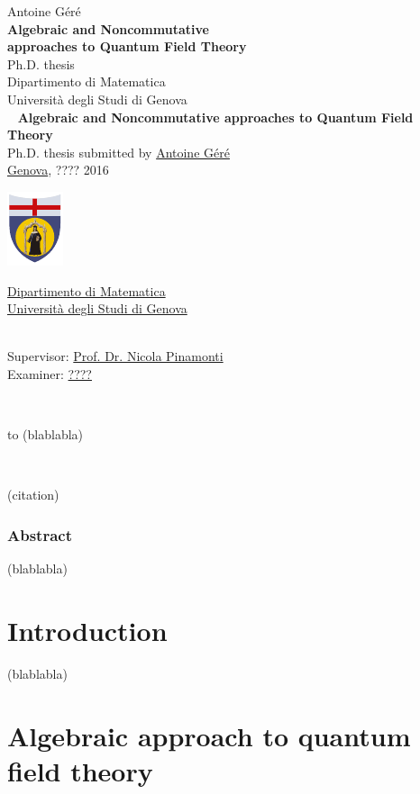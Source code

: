 \documentclass[10pt]{book}
\makeatletter
\newcommand*{\makepagetitle}{%
%
{\raggedright%
%
%
%
%
\thispagestyle{empty}%
%
\vspace*{50pt}
%
{\LARGE Antoine Géré}\\%
%
\vspace*{120pt}%
%
{\Huge\bfseries Algebraic and Noncommutative \\[8pt] approaches to Quantum Field Theory}\\[\baselineskip]%
%
\vspace*{60pt}%
%
{\LARGE Ph.D. thesis}\\[\baselineskip]%
%
\vspace*{60pt}%
%
{\LARGE Dipartimento di Matematica}\\[\baselineskip]%
%
\vspace*{1pt}
%
{\LARGE Università degli Studi di Genova}\\[\baselineskip]%
%
\vfill%
%
%
%
%
\newpage%
%
\thispagestyle{empty}%
%
\ \vfill%
%
%
\textbf{Algebraic and Noncommutative approaches to Quantum Field Theory} \\[2pt]
Ph.D. thesis submitted by \href{mailto:gere@dima.unige.it}{Antoine Géré} \\[1pt]
\href{http://www.comune.genova.it/}{Genova}, ???? 2016 \\[10pt]
%
%
\begin{minipage}{0.1\linewidth}
\includegraphics[scale=1]{unige.pdf}
\end{minipage}
%
\begin{minipage}{0.85\linewidth}
\href{http://www.dima.unige.it/}{Dipartimento di Matematica} \\[1pt]
\href{http://www.unige.it/}{Università degli Studi di Genova}
\end{minipage}
%
%
\vspace*{10pt} \\
Supervisor: \href{mailto:pinamont@dima.unige.it}{Prof. Dr. Nicola Pinamonti} \\[1pt]
%
Examiner: \href{mailto:????@????.com}{????}
%
%
%
%
%
}%
%
}%
\theoremstyle{break}
\makeatother
\begin{document}


\makepagetitle

\newpage


\ \vfill

\begin{flushright}
to (blablabla) 
\end{flushright}

\vfill


\newpage

\ \vfill

\begin{flushright}
(citation)
\end{flushright}

\vfill


\newpage

\vspace*{100pt}

\thispagestyle{empty}

\section*{Abstract}

(blablabla)


\tableofcontents


\part*{Introduction}


(blablabla)

\part{Algebraic approach to quantum field theory}
\end{document}
